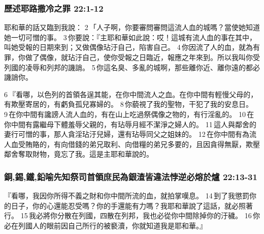 \subsubsection{歷述耶路撒冷之罪 22:1-12}
耶和華的話又臨到我說： 2 「人子啊，你要審問審問這流人血的城嗎？當使她知道她一切可憎的事。 3 你要說：『主耶和華如此說：哎！這城有流人血的事在其中，叫她受報的日期來到；又做偶像玷汙自己，陷害自己。 4 你因流了人的血，就為有罪，你做了偶像，就玷汙自己，使你受報之日臨近，報應之年來到。所以我叫你受列國的凌辱和列邦的譏誚。 5 你這名臭、多亂的城啊，那些離你近、離你遠的都必譏誚你。

6 『看哪，以色列的首領各逞其能，在你中間流人之血。在你中間有輕慢父母的，有欺壓寄居的，有虧負孤兒寡婦的。 8 你藐視了我的聖物，干犯了我的安息日。 9 在你中間有讒謗人流人血的，有在山上吃過祭偶像之物的，有行淫亂的。 10 在你中間有露繼母下體羞辱父親的，有玷辱月經不潔淨之婦人的。 11 這人與鄰舍的妻行可憎的事，那人貪淫玷汙兒婦，還有玷辱同父之姐妹的。 12 在你中間有為流人血受賄賂的，有向借錢的弟兄取利、向借糧的弟兄多要的，且因貪得無厭，欺壓鄰舍奪取財物，竟忘了我。這是主耶和華說的。
\subsubsection{銅,錫,鐵,鉛喻先知祭司首領庶民為銀渣皆違法悖逆必熔於爐 22:13-31}
『看哪，我因你所得不義之財和你中間所流的血，就拍掌嘆息。 14 到了我懲罰你的日子，你的心還能忍受嗎？你的手還能有力嗎？我耶和華說了這話，就必照著行。 15 我必將你分散在列國，四散在列邦，我也必從你中間除掉你的汙穢。 16 你必在列國人的眼前因自己所行的被褻瀆，你就知道我是耶和華。』

